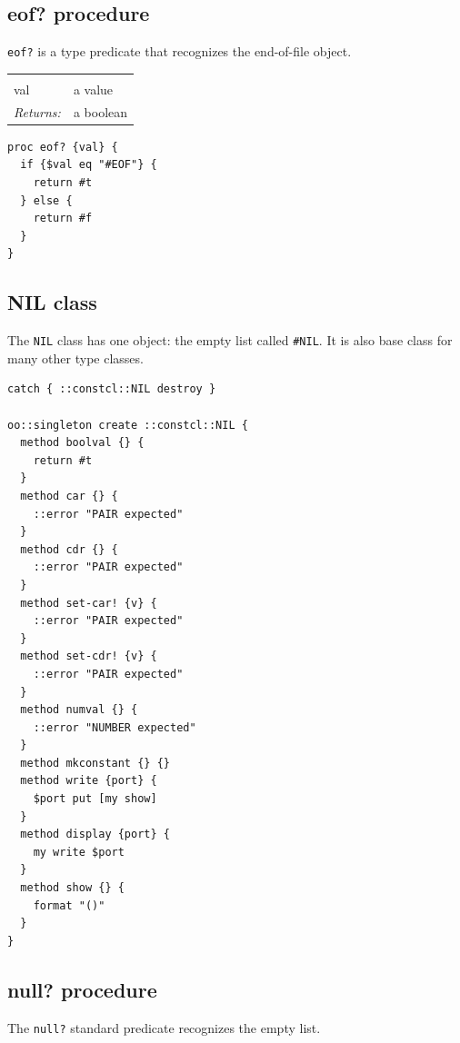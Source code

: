 \documentclass[twoside]{report}
\begin{document}
\subsection{eof? procedure}
\label{eof-procedure}

\texttt{eof?} is a type predicate that recognizes the end-of-file object.

\noindent\begin{tabular}{ |p{1.9cm} p{8cm}| }
\hline
\rowcolor[HTML]{CCCCCC} \multicolumn{2}{|l|}{\bf eof? (internal)} \\
val & a value \\
\textit{Returns:} & a boolean \\
\hline
\end{tabular}

\begin{lstlisting}
proc eof? {val} {
  if {$val eq "#EOF"} {
    return #t
  } else {
    return #f
  }
}
\end{lstlisting}

\subsection{NIL class}
\label{nil-class}

The \texttt{NIL} class has one object: the empty list called \texttt{\#NIL}. It is also base class for many other type classes.

\begin{lstlisting}
catch { ::constcl::NIL destroy }

oo::singleton create ::constcl::NIL {
  method boolval {} {
    return #t
  }
  method car {} {
    ::error "PAIR expected"
  }
  method cdr {} {
    ::error "PAIR expected"
  }
  method set-car! {v} {
    ::error "PAIR expected"
  }
  method set-cdr! {v} {
    ::error "PAIR expected"
  }
  method numval {} {
    ::error "NUMBER expected"
  }
  method mkconstant {} {}
  method write {port} {
    $port put [my show]
  }
  method display {port} {
    my write $port
  }
  method show {} {
    format "()"
  }
}
\end{lstlisting}

\subsection{null? procedure}
\label{null-procedure}

The \texttt{null?} standard predicate recognizes the empty list.
\end{document}
